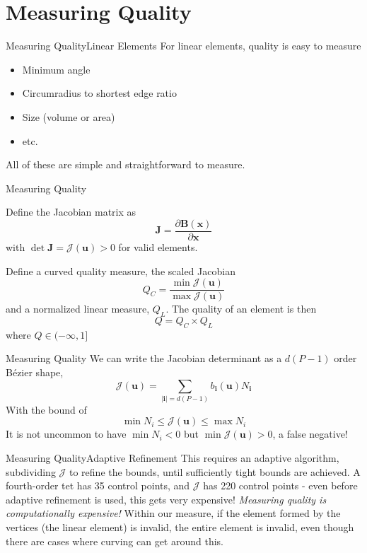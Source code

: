 \documentclass[12pt]{beamer}
\newcommand{\dst}{\displaystyle}
\newcommand{\spa}{\vspace{0.5cm}\newline}
\begin{document}
\section{Measuring Quality}
\begin{frame}{Measuring Quality}{Linear Elements}
For linear elements, quality is easy to measure
\begin{itemize}
\item Minimum angle
\item Circumradius to shortest edge ratio
\item Size (volume or area)
\item etc.
\end{itemize}
All of these are simple and straightforward to measure. 
\end{frame}
\begin{frame}{Measuring Quality}

Define the Jacobian matrix as
\[\mathbf{J} = \frac{\partial \mathbf{B}(\mathbf{x})}{\partial \mathbf{x}}\]
with $\det \mathbf{J} = \mathcal{J}(\mathbf{u}) > 0$ for valid elements.

Define a curved quality measure, the scaled Jacobian
\[
Q_C = \frac{\min \mathcal{J}(\mathbf{u})}{\max \mathcal{J}(\mathbf{u})}
\]
and a normalized linear measure, $Q_L$. The quality of an element is then
\[
Q = Q_C\times Q_L
\]
where $Q \in (-\infty,1]$
\end{frame}
\begin{frame}{Measuring Quality}
We can write the Jacobian determinant as a $d(P-1)$ order B{\'e}zier shape,
\[
\mathcal{J}(\mathbf{u}) = \dst\sum_{|\mathbf{i}|=d(P-1)} b_{\mathbf{i}}(\mathbf{u})N_{\mathbf{i}} \]
With the bound of
\[
\min N_i \leq \mathcal{J}(\mathbf{u}) \leq \max N_i
\]
It is not uncommon to have $\min N_i < 0$ but $\min \mathcal{J}(\mathbf{u}) > 0$, a false negative! \spa
\end{frame}
\begin{frame}{Measuring Quality}{Adaptive Refinement}
This requires an adaptive algorithm, subdividing $\mathcal{J}$ to refine the bounds, until sufficiently tight bounds are achieved. \spa
A fourth-order tet has 35 control points, and $\mathcal{J}$ has 220 control points - even before adaptive refinement is used, this gets very expensive! \spa
\textit{Measuring quality is computationally expensive!} \spa
Within our measure, if the element formed by the vertices (the linear element) is invalid, the entire element is invalid, even though there are cases where curving can get around this.
\end{frame}
\end{document}
